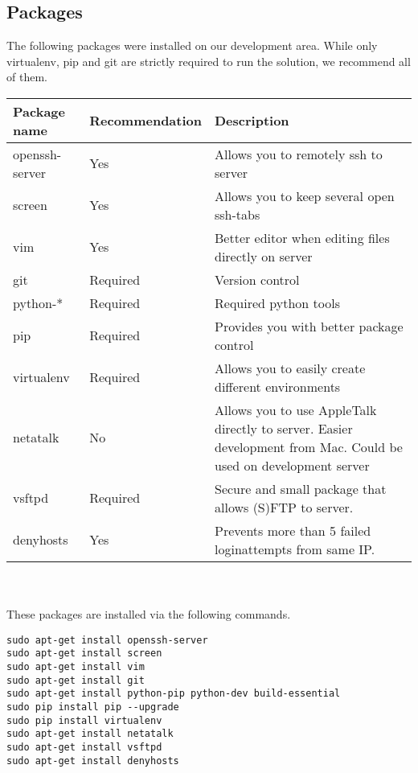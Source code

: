 \documentclass{report}
\begin{document}
\subsection{Packages}
The following packages were installed on our development area. While only virtualenv, pip and git are strictly required to run the solution, we recommend all of them.\\
\begin{tabular}{| l | l | p{9cm} |} \hline
\textbf{Package name} & \textbf{Recommendation} & \textbf{Description} \\ \hline
openssh-server\cite{website:openssh} & Yes & Allows you to remotely ssh to server \\ \hline
screen\cite{website:screen} & Yes & Allows you to keep several open ssh-tabs \\ \hline
vim\cite{website:vim} & Yes & Better editor when editing files directly on server\\ \hline
git\cite{website:git} & Required & Version control \\ \hline
python-*\cite{website:buildessentatial} & Required & Required python tools \\ \hline
pip\cite{website:pip} & Required & Provides you with better package control \\ \hline
virtualenv\cite{website:virtualenv} & Required & Allows you to easily create different environments\\ \hline
netatalk\cite{website:netatalk} & No & Allows you to use AppleTalk directly to server. Easier development from Mac. Could be used on development server \\ \hline
vsftpd\cite{website:vsftpd} & Required & Secure and small package that allows (S)FTP to server. \\ \hline
denyhosts\cite{website:denyhosts} & Yes & Prevents more than 5 failed loginattempts from same IP. \\ \hline
\end{tabular}\\ \\
These packages are installed via the following commands.

\begin{verbatim}
sudo apt-get install openssh-server
sudo apt-get install screen
sudo apt-get install vim
sudo apt-get install git
sudo apt-get install python-pip python-dev build-essential
sudo pip install pip --upgrade
sudo pip install virtualenv
sudo apt-get install netatalk 
sudo apt-get install vsftpd
sudo apt-get install denyhosts 
\end{verbatim}
\end{document}
